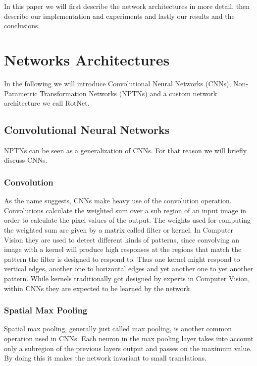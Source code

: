 \documentclass{llncs}
\begin{document}
In this paper we will first describe the network architectures in more detail, then describe our implementation and experiments and lastly our results and the conclusions.

\section{Networks Architectures} In the following we will introduce Convolutional Neural Networks (CNNs), Non-Parametric Transformation Networks (NPTNs) and a custom network architecture we call RotNet.

\subsection{Convolutional Neural Networks}
NPTNs can be seen as a generalization of CNNs. For that reason we will briefly discuss CNNs. 
\subsubsection{Convolution}
As the name suggests, CNNs make heavy use of the convolution operation. Convolutions
 calculate the weighted sum over a sub region of an input image in order to calculate the pixel values of the output. The weights used for computing the weighted sum are given by a matrix called filter or kernel. In Computer Vision they are used to detect different kinds of patterns, since convolving an image with a kernel will produce high responses at the regions that match the pattern the filter is designed to respond to. Thus one kernel might respond to vertical edges, another  one to horizontal edges and yet another one to yet another pattern. While kernels traditionally got designed by experts in Computer Vision, within CNNs they are expected to be learned by the network.


\subsubsection{Spatial Max Pooling}
Spatial max pooling, generally just called max pooling, is another common operation used in CNNs.
Each neuron in the max pooling layer takes into account only a subregion of the previous
layers output and passes on the maximum value. By doing this it makes the network invariant to small translations. 
\end{document}
